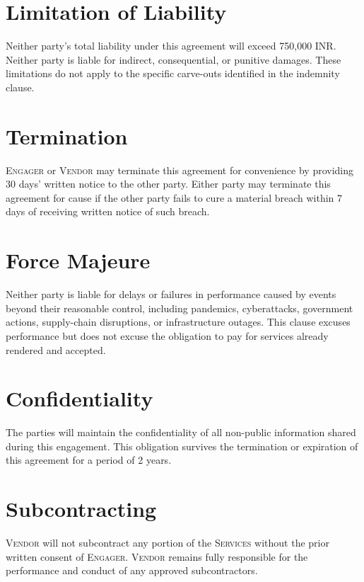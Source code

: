 \documentclass[11pt,letterpaper]{article}
\begin{document}
\section{Limitation of Liability}
Neither party's total liability under this agreement will exceed 750,000 INR. Neither party is liable for indirect, consequential, or punitive damages. These limitations do not apply to the specific carve-outs identified in the indemnity clause.

\section{Termination}
\textsc{Engager} or \textsc{Vendor} may terminate this agreement for convenience by providing 30 days' written notice to the other party. Either party may terminate this agreement for cause if the other party fails to cure a material breach within 7 days of receiving written notice of such breach.

\section{Force Majeure}
Neither party is liable for delays or failures in performance caused by events beyond their reasonable control, including pandemics, cyberattacks, government actions, supply-chain disruptions, or infrastructure outages. This clause excuses performance but does not excuse the obligation to pay for services already rendered and accepted.

\section{Confidentiality}
The parties will maintain the confidentiality of all non-public information shared during this engagement. This obligation survives the termination or expiration of this agreement for a period of 2 years.

\section{Subcontracting}
\textsc{Vendor} will not subcontract any portion of the \textsc{Services} without the prior written consent of \textsc{Engager}. \textsc{Vendor} remains fully responsible for the performance and conduct of any approved subcontractors.
\end{document}

